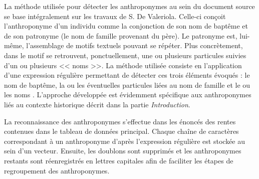 La méthode utilisée pour détecter les anthroponymes au sein du document source se base intégralement sur les travaux de S. De Valeriola. Celle-ci conçoit l'anthroponyme d'un individu comme la conjonction de son nom de baptême et de son patronyme (le nom de famille provenant du père).
Le patronyme est, lui-même, l'assemblage de motifs textuels pouvant se répéter.
Plus concrètement, dans le motif se retrouvent, ponctuellement,  une ou plusieurs particules  suivies d'un ou plusieurs << noms >>. La méthode  utilisée consiste en l'application d'une expression régulière permettant de détecter ces trois éléments évoqués : le nom de baptême, la ou les éventuelles particules liées au nom de famille et le ou les noms \parencite{de_valeriola_lordinateur_2021}. L'approche développée est évidemment spécifique aux anthroponymes liés au contexte historique décrit dans la partie \textit{Introduction}.

La reconnaissance des anthroponymes s'effectue dans les énoncés des rentes contenues dans le tableau de données principal. Chaque chaîne de caractères correspondant à un anthroponyme d'après l'expression régulière est stockée au sein d'un vecteur. Ensuite, les doublons sont supprimés et les anthroponymes restants sont réenregistrés en lettres capitales afin de faciliter les étapes de regroupement des anthroponymes.

